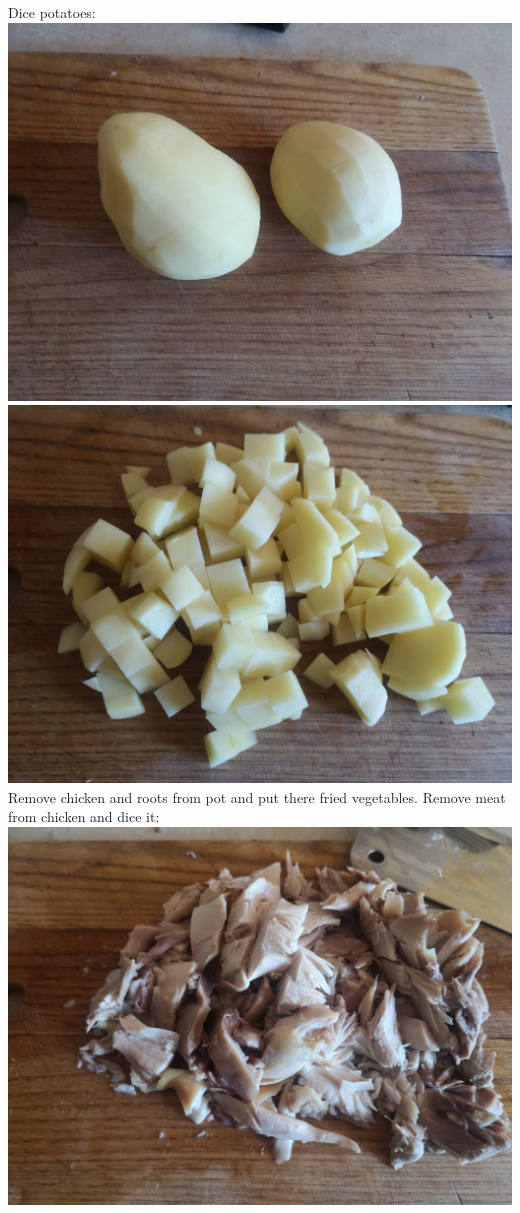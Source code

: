 \documentclass[11pt,a4paper]{article}
\begin{document}
Dice potatoes: \\
\includegraphics[width=\textwidth]{11.jpg} \\
\includegraphics[width=\textwidth]{12.jpg} \\

Remove chicken and roots from pot and put there fried vegetables. Remove meat from chicken and dice it: \\
\includegraphics[width=\textwidth]{13.jpg} \\
\end{document}
